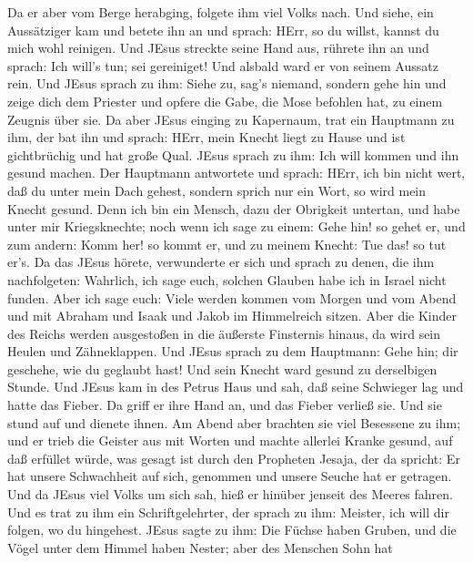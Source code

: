  Da er aber vom Berge herabging, folgete ihm viel Volks
nach.  Und siehe, ein Aussätziger kam und betete ihn an und
sprach: HErr, so du willst, kannst du mich wohl reinigen. 
Und JEsus streckte seine Hand aus, rührete ihn an und sprach: Ich will's
tun; sei gereiniget! Und alsbald ward er von seinem Aussatz rein.
 Und JEsus sprach zu ihm: Siehe zu, sag's niemand, sondern
gehe hin und zeige dich dem Priester und opfere die Gabe, die Mose
befohlen hat, zu einem Zeugnis über sie.  Da aber JEsus
einging zu Kapernaum, trat ein Hauptmann zu ihm, der bat ihn
 und sprach: HErr, mein Knecht liegt zu Hause und ist
gichtbrüchig und hat große Qual.  JEsus sprach zu ihm: Ich
will kommen und ihn gesund machen.  Der Hauptmann antwortete
und sprach: HErr, ich bin nicht wert, daß du unter mein Dach gehest,
sondern sprich nur ein Wort, so wird mein Knecht gesund. 
Denn ich bin ein Mensch, dazu der Obrigkeit untertan, und habe unter mir
Kriegsknechte; noch wenn ich sage zu einem: Gehe hin! so gehet er, und
zum andern: Komm her! so kommt er, und zu meinem Knecht: Tue das! so tut
er's.  Da das JEsus hörete, verwunderte er sich und sprach
zu denen, die ihm nachfolgeten: Wahrlich, ich sage euch, solchen Glauben
habe ich in Israel nicht funden.  Aber ich sage euch: Viele
werden kommen vom Morgen und vom Abend und mit Abraham und Isaak und
Jakob im Himmelreich sitzen.  Aber die Kinder des Reichs
werden ausgestoßen in die äußerste Finsternis hinaus, da wird sein
Heulen und Zähneklappen.  Und JEsus sprach zu dem
Hauptmann: Gehe hin; dir geschehe, wie du geglaubt hast! Und sein Knecht
ward gesund zu derselbigen Stunde.  Und JEsus kam in des
Petrus Haus und sah, daß seine Schwieger lag und hatte das Fieber.
 Da griff er ihre Hand an, und das Fieber verließ sie. Und
sie stund auf und dienete ihnen.  Am Abend aber brachten
sie viel Besessene zu ihm; und er trieb die Geister aus mit Worten und
machte allerlei Kranke gesund,  auf daß erfüllet würde, was
gesagt ist durch den Propheten Jesaja, der da spricht: Er hat unsere
Schwachheit auf sich, genommen und unsere Seuche hat er getragen.
 Und da JEsus viel Volks um sich sah, hieß er hinüber
jenseit des Meeres fahren.  Und es trat zu ihm ein
Schriftgelehrter, der sprach zu ihm: Meister, ich will dir folgen, wo du
hingehest.  JEsus sagte zu ihm: Die Füchse haben Gruben,
und die Vögel unter dem Himmel haben Nester; aber des Menschen Sohn hat
